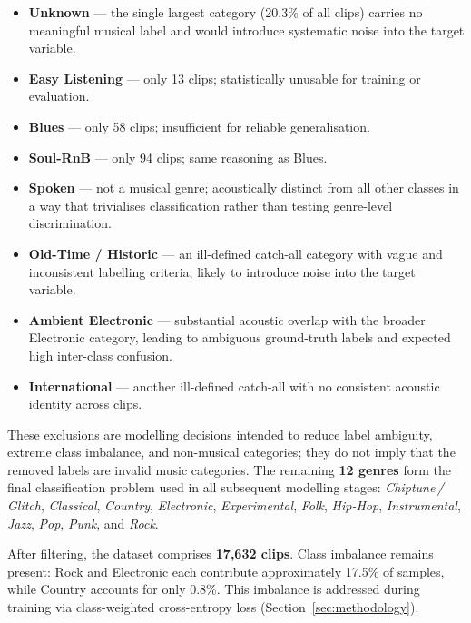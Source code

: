 \documentclass[12pt, a4paper]{article}
\begin{document}
\begin{itemize}[noitemsep, topsep=4pt]
    \item \textbf{Unknown} --- the single largest category (20.3\% of
          all clips) carries no meaningful musical label and would
          introduce systematic noise into the target variable.
    \item \textbf{Easy Listening} --- only 13 clips; statistically
          unusable for training or evaluation.
    \item \textbf{Blues} --- only 58 clips; insufficient for reliable
          generalisation.
    \item \textbf{Soul-RnB} --- only 94 clips; same reasoning as Blues.
    \item \textbf{Spoken} --- not a musical genre; acoustically distinct
          from all other classes in a way that trivialises classification
          rather than testing genre-level discrimination.
    \item \textbf{Old-Time / Historic} --- an ill-defined catch-all
          category with vague and inconsistent labelling criteria, likely
          to introduce noise into the target variable.
    \item \textbf{Ambient Electronic} --- substantial acoustic overlap
          with the broader Electronic category, leading to ambiguous
          ground-truth labels and expected high inter-class confusion.
    \item \textbf{International} --- another ill-defined catch-all with
          no consistent acoustic identity across clips.
\end{itemize}

These exclusions are modelling decisions intended to reduce label ambiguity, extreme
class imbalance, and non-musical categories; they do not imply that the removed labels
are invalid music categories.
The remaining \textbf{12 genres} form the final classification problem
used in all subsequent modelling stages:
\textit{Chiptune\,/\,Glitch}, \textit{Classical}, \textit{Country},
\textit{Electronic}, \textit{Experimental}, \textit{Folk},
\textit{Hip-Hop}, \textit{Instrumental}, \textit{Jazz}, \textit{Pop},
\textit{Punk}, and \textit{Rock}.

After filtering, the dataset comprises \textbf{17{,}632 clips}.
Class imbalance remains present: Rock and Electronic each contribute
approximately 17.5\% of samples, while Country accounts for only 0.8\%.
This imbalance is addressed during training via class-weighted
cross-entropy loss (Section~\ref{sec:methodology}).
\end{document}
